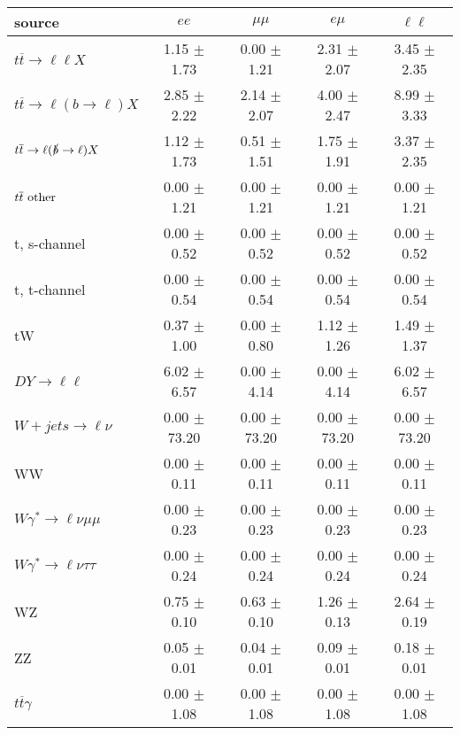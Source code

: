 \begin{tabular}{l|cccc} \hline\hline
source & $ee$ & $\mu\mu$ & $e\mu$ & $\ell\ell $ \\
\hline
$t\overline{t} \rightarrow \ell \ell X$ &  1.15 $\pm$  1.73 &  0.00 $\pm$  1.21 &  2.31 $\pm$  2.07 &  3.45 $\pm$  2.35 \\
$t\overline{t} \rightarrow \ell (b \rightarrow \ell) X$ &  2.85 $\pm$  2.22 &  2.14 $\pm$  2.07 &  4.00 $\pm$  2.47 &  8.99 $\pm$  3.33 \\
$t\overline{t} \rightarrow \ell (\slashed b \rightarrow \ell) X$ &  1.12 $\pm$  1.73 &  0.51 $\pm$  1.51 &  1.75 $\pm$  1.91 &  3.37 $\pm$  2.35 \\
        $t\overline{t}\ \rm{other}$ &  0.00 $\pm$  1.21 &  0.00 $\pm$  1.21 &  0.00 $\pm$  1.21 &  0.00 $\pm$  1.21 \\
\hline
                       t, s-channel &  0.00 $\pm$  0.52 &  0.00 $\pm$  0.52 &  0.00 $\pm$  0.52 &  0.00 $\pm$  0.52 \\
                       t, t-channel &  0.00 $\pm$  0.54 &  0.00 $\pm$  0.54 &  0.00 $\pm$  0.54 &  0.00 $\pm$  0.54 \\
                                 tW &  0.37 $\pm$  1.00 &  0.00 $\pm$  0.80 &  1.12 $\pm$  1.26 &  1.49 $\pm$  1.37 \\
\hline
         $DY \rightarrow \ell \ell$ &  6.02 $\pm$  6.57 &  0.00 $\pm$  4.14 &  0.00 $\pm$  4.14 &  6.02 $\pm$  6.57 \\
      $W+jets \rightarrow \ell \nu$ &  0.00 $\pm$ 73.20 &  0.00 $\pm$ 73.20 &  0.00 $\pm$ 73.20 &  0.00 $\pm$ 73.20 \\
                                 WW &  0.00 $\pm$  0.11 &  0.00 $\pm$  0.11 &  0.00 $\pm$  0.11 &  0.00 $\pm$  0.11 \\
\hline
$W\gamma^{*} \rightarrow \ell \nu \mu\mu$ &  0.00 $\pm$  0.23 &  0.00 $\pm$  0.23 &  0.00 $\pm$  0.23 &  0.00 $\pm$  0.23 \\
$W\gamma^{*} \rightarrow \ell \nu \tau\tau$ &  0.00 $\pm$  0.24 &  0.00 $\pm$  0.24 &  0.00 $\pm$  0.24 &  0.00 $\pm$  0.24 \\
                                 WZ &  0.75 $\pm$  0.10 &  0.63 $\pm$  0.10 &  1.26 $\pm$  0.13 &  2.64 $\pm$  0.19 \\
                                 ZZ &  0.05 $\pm$  0.01 &  0.04 $\pm$  0.01 &  0.09 $\pm$  0.01 &  0.18 $\pm$  0.01 \\
\hline
              $t\overline{t}\gamma$ &  0.00 $\pm$  1.08 &  0.00 $\pm$  1.08 &  0.00 $\pm$  1.08 &  0.00 $\pm$  1.08 \\

\end{tabular}
